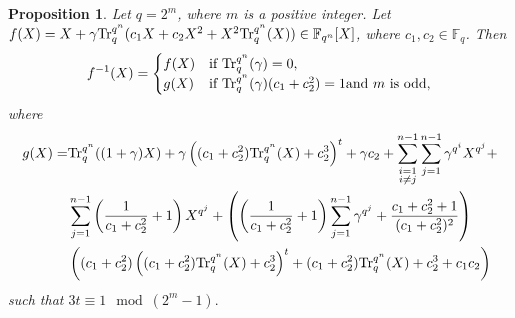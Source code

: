\documentclass[11pt]{amsart}
\theoremstyle{plain}
\newtheorem{prop}[thm]{Proposition}
\numberwithin{equation}{section}
\theoremstyle{definition}
\newcommand{\F}{\mathbb F}
\def\Tr{{\rm Tr}}
\begin{document}
\begin{prop}\label{P41}
     Let $q=2^m$, where $m$ is a positive integer. Let $f(X)=X+\gamma \Tr_{q}^{q^n}(c_1X+c_2X^2+X^2\Tr_{q}^{q^n}(X))\in \F_{q^n}[X]$, where $c_1, c_2 \in \F_q$. Then
     \[
     f^{-1}(X)=
     \begin{cases}
         f(X) & \text{if } \Tr_{q}^{q^n}(\gamma)=0,\\
         g(X) & \text{if } \Tr_{q}^{q^n}(\gamma)(c_1+c_2^2)=1  \text{and $m$ is odd}, 
     \end{cases}
     \]
     where 
     \begin{equation*}
     \begin{split}
         g(X)=&\Tr_{q}^{q^n}((1+\gamma)X)+\gamma\left((c_1+c_2^2)\Tr_{q}^{q^n}(X)+c_2^3\right)^t+\gamma c_2+\displaystyle\sum_{\substack{i=1\\ i\neq j}}^{n-1}\sum_{j=1}^{n-1}\gamma^{q^i}X^{q^j}+\\
     &\sum_{j=1}^{n-1}\left(\frac{1}{c_1+c_2^2}+1\right)X^{q^j}+\left(\left(\frac{1}{c_1+c_2^2}+1\right)\sum_{j=1}^{n-1}\gamma^{q^j}+\frac{c_1+c_2^2+1}{(c_1+c_2^2)^2}\right)\\
     &\left((c_1+c_2^2)\left((c_1+c_2^2)\Tr_{q}^{q^n}(X)+c_2^3\right)^t+(c_1+c_2^2)\Tr_{q}^{q^n}(X)+c_2^3+c_1c_2\right)
     \end{split}
     \end{equation*}
     such that $3t \equiv 1 \mod(2^m-1).$
      
\end{prop}
\end{document}
